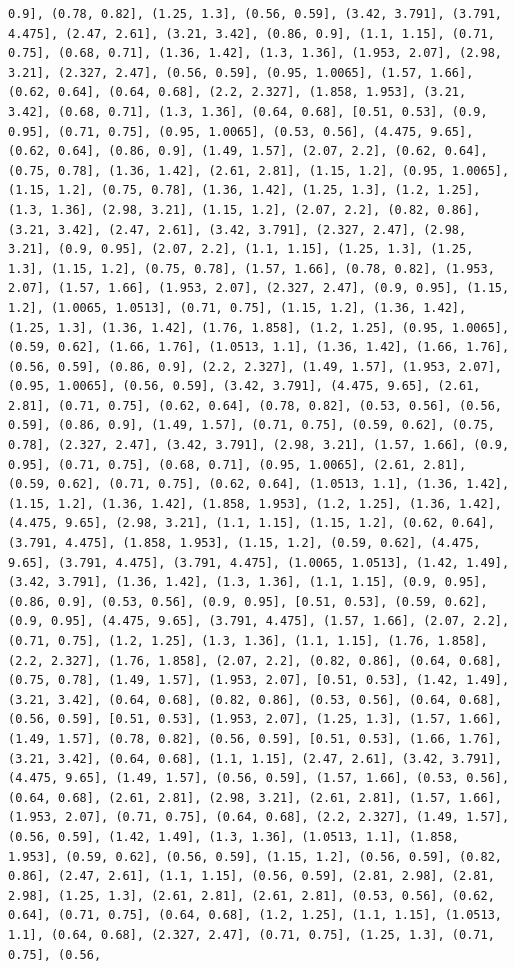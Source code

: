\documentclass[12pt,fleqn]{article}\usepackage{../common}
\begin{document}
\begin{verbatim}
0.9], (0.78, 0.82], (1.25, 1.3], (0.56, 0.59], (3.42, 3.791], (3.791, 4.475], (2.47, 2.61], (3.21, 3.42], (0.86, 0.9], (1.1, 1.15], (0.71, 0.75], (0.68, 0.71], (1.36, 1.42], (1.3, 1.36], (1.953, 2.07], (2.98, 3.21], (2.327, 2.47], (0.56, 0.59], (0.95, 1.0065], (1.57, 1.66], (0.62, 0.64], (0.64, 0.68], (2.2, 2.327], (1.858, 1.953], (3.21, 3.42], (0.68, 0.71], (1.3, 1.36], (0.64, 0.68], [0.51, 0.53], (0.9, 0.95], (0.71, 0.75], (0.95, 1.0065], (0.53, 0.56], (4.475, 9.65], (0.62, 0.64], (0.86, 0.9], (1.49, 1.57], (2.07, 2.2], (0.62, 0.64], (0.75, 0.78], (1.36, 1.42], (2.61, 2.81], (1.15, 1.2], (0.95, 1.0065], (1.15, 1.2], (0.75, 0.78], (1.36, 1.42], (1.25, 1.3], (1.2, 1.25], (1.3, 1.36], (2.98, 3.21], (1.15, 1.2], (2.07, 2.2], (0.82, 0.86], (3.21, 3.42], (2.47, 2.61], (3.42, 3.791], (2.327, 2.47], (2.98, 3.21], (0.9, 0.95], (2.07, 2.2], (1.1, 1.15], (1.25, 1.3], (1.25, 1.3], (1.15, 1.2], (0.75, 0.78], (1.57, 1.66], (0.78, 0.82], (1.953, 2.07], (1.57, 1.66], (1.953, 2.07], (2.327, 2.47], (0.9, 0.95], (1.15, 1.2], (1.0065, 1.0513], (0.71, 0.75], (1.15, 1.2], (1.36, 1.42], (1.25, 1.3], (1.36, 1.42], (1.76, 1.858], (1.2, 1.25], (0.95, 1.0065], (0.59, 0.62], (1.66, 1.76], (1.0513, 1.1], (1.36, 1.42], (1.66, 1.76], (0.56, 0.59], (0.86, 0.9], (2.2, 2.327], (1.49, 1.57], (1.953, 2.07], (0.95, 1.0065], (0.56, 0.59], (3.42, 3.791], (4.475, 9.65], (2.61, 2.81], (0.71, 0.75], (0.62, 0.64], (0.78, 0.82], (0.53, 0.56], (0.56, 0.59], (0.86, 0.9], (1.49, 1.57], (0.71, 0.75], (0.59, 0.62], (0.75, 0.78], (2.327, 2.47], (3.42, 3.791], (2.98, 3.21], (1.57, 1.66], (0.9, 0.95], (0.71, 0.75], (0.68, 0.71], (0.95, 1.0065], (2.61, 2.81], (0.59, 0.62], (0.71, 0.75], (0.62, 0.64], (1.0513, 1.1], (1.36, 1.42], (1.15, 1.2], (1.36, 1.42], (1.858, 1.953], (1.2, 1.25], (1.36, 1.42], (4.475, 9.65], (2.98, 3.21], (1.1, 1.15], (1.15, 1.2], (0.62, 0.64], (3.791, 4.475], (1.858, 1.953], (1.15, 1.2], (0.59, 0.62], (4.475, 9.65], (3.791, 4.475], (3.791, 4.475], (1.0065, 1.0513], (1.42, 1.49], (3.42, 3.791], (1.36, 1.42], (1.3, 1.36], (1.1, 1.15], (0.9, 0.95], (0.86, 0.9], (0.53, 0.56], (0.9, 0.95], [0.51, 0.53], (0.59, 0.62], (0.9, 0.95], (4.475, 9.65], (3.791, 4.475], (1.57, 1.66], (2.07, 2.2], (0.71, 0.75], (1.2, 1.25], (1.3, 1.36], (1.1, 1.15], (1.76, 1.858], (2.2, 2.327], (1.76, 1.858], (2.07, 2.2], (0.82, 0.86], (0.64, 0.68], (0.75, 0.78], (1.49, 1.57], (1.953, 2.07], [0.51, 0.53], (1.42, 1.49], (3.21, 3.42], (0.64, 0.68], (0.82, 0.86], (0.53, 0.56], (0.64, 0.68], (0.56, 0.59], [0.51, 0.53], (1.953, 2.07], (1.25, 1.3], (1.57, 1.66], (1.49, 1.57], (0.78, 0.82], (0.56, 0.59], [0.51, 0.53], (1.66, 1.76], (3.21, 3.42], (0.64, 0.68], (1.1, 1.15], (2.47, 2.61], (3.42, 3.791], (4.475, 9.65], (1.49, 1.57], (0.56, 0.59], (1.57, 1.66], (0.53, 0.56], (0.64, 0.68], (2.61, 2.81], (2.98, 3.21], (2.61, 2.81], (1.57, 1.66], (1.953, 2.07], (0.71, 0.75], (0.64, 0.68], (2.2, 2.327], (1.49, 1.57], (0.56, 0.59], (1.42, 1.49], (1.3, 1.36], (1.0513, 1.1], (1.858, 1.953], (0.59, 0.62], (0.56, 0.59], (1.15, 1.2], (0.56, 0.59], (0.82, 0.86], (2.47, 2.61], (1.1, 1.15], (0.56, 0.59], (2.81, 2.98], (2.81, 2.98], (1.25, 1.3], (2.61, 2.81], (2.61, 2.81], (0.53, 0.56], (0.62, 0.64], (0.71, 0.75], (0.64, 0.68], (1.2, 1.25], (1.1, 1.15], (1.0513, 1.1], (0.64, 0.68], (2.327, 2.47], (0.71, 0.75], (1.25, 1.3], (0.71, 0.75], (0.56, 
\end{verbatim}
\end{document}
